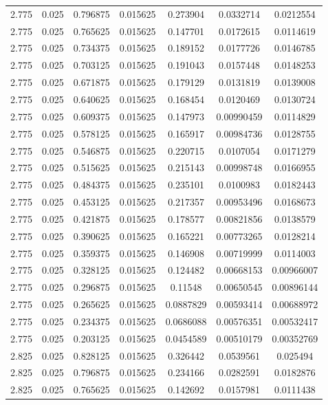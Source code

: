 \begin{flushleft}
\begin{longtable}{ccccccc}
2.775 & 0.025 & 0.796875 & 0.015625 & 0.273904 & 0.0332714 & 0.0212554  \\ 
2.775 & 0.025 & 0.765625 & 0.015625 & 0.147701 & 0.0172615 & 0.0114619  \\ 
2.775 & 0.025 & 0.734375 & 0.015625 & 0.189152 & 0.0177726 & 0.0146785  \\ 
2.775 & 0.025 & 0.703125 & 0.015625 & 0.191043 & 0.0157448 & 0.0148253  \\ 
2.775 & 0.025 & 0.671875 & 0.015625 & 0.179129 & 0.0131819 & 0.0139008  \\ 
2.775 & 0.025 & 0.640625 & 0.015625 & 0.168454 & 0.0120469 & 0.0130724  \\ 
2.775 & 0.025 & 0.609375 & 0.015625 & 0.147973 & 0.00990459 & 0.0114829  \\ 
2.775 & 0.025 & 0.578125 & 0.015625 & 0.165917 & 0.00984736 & 0.0128755  \\ 
2.775 & 0.025 & 0.546875 & 0.015625 & 0.220715 & 0.0107054 & 0.0171279  \\ 
2.775 & 0.025 & 0.515625 & 0.015625 & 0.215143 & 0.00998748 & 0.0166955  \\ 
2.775 & 0.025 & 0.484375 & 0.015625 & 0.235101 & 0.0100983 & 0.0182443  \\ 
2.775 & 0.025 & 0.453125 & 0.015625 & 0.217357 & 0.00953496 & 0.0168673  \\ 
2.775 & 0.025 & 0.421875 & 0.015625 & 0.178577 & 0.00821856 & 0.0138579  \\ 
2.775 & 0.025 & 0.390625 & 0.015625 & 0.165221 & 0.00773265 & 0.0128214  \\ 
2.775 & 0.025 & 0.359375 & 0.015625 & 0.146908 & 0.00719999 & 0.0114003  \\ 
2.775 & 0.025 & 0.328125 & 0.015625 & 0.124482 & 0.00668153 & 0.00966007  \\ 
2.775 & 0.025 & 0.296875 & 0.015625 & 0.11548 & 0.00650545 & 0.00896144  \\ 
2.775 & 0.025 & 0.265625 & 0.015625 & 0.0887829 & 0.00593414 & 0.00688972  \\ 
2.775 & 0.025 & 0.234375 & 0.015625 & 0.0686088 & 0.00576351 & 0.00532417  \\ 
2.775 & 0.025 & 0.203125 & 0.015625 & 0.0454589 & 0.00510179 & 0.00352769  \\ 
2.825 & 0.025 & 0.828125 & 0.015625 & 0.326442 & 0.0539561 & 0.025494  \\ 
2.825 & 0.025 & 0.796875 & 0.015625 & 0.234166 & 0.0282591 & 0.0182876  \\ 
2.825 & 0.025 & 0.765625 & 0.015625 & 0.142692 & 0.0157981 & 0.0111438  \\ 

\end{longtable}
\end{flushleft}

